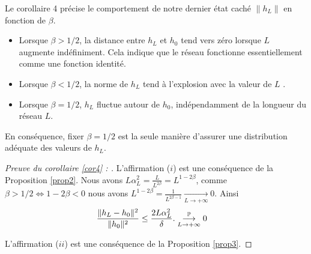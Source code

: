 Le corollaire 4 précise le comportement de notre dernier état caché $\left\| h_L \right\|$ en fonction de $\beta$.
\begin{itemize}
    \item Lorsque $\beta > 1/2$, la distance entre $h_L$ et $h_0$ tend vers zéro lorsque $L$ augmente indéfiniment. Cela indique que le réseau fonctionne essentiellement comme une fonction identité.
    \item Lorsque $\beta < 1/2$, la norme de $h_L$ tend à l'explosion avec la valeur de $ L $ .
    \item Lorsque $\beta = 1/2$, $h_L$ fluctue autour de $h_0$, indépendamment de la longueur du réseau $L$.
\end{itemize}
En conséquence, fixer $\beta = 1/2$ est la seule manière d'assurer une distribution adéquate des valeurs de $h_L$.


\begin{proof}[Preuve du corollaire \ref{cor4} : ]
    L'affirmation ($ i $) est une conséquence de la Proposition \ref{prop2}. Nous avons $ L \alpha _L ^2 = \frac{L}{L^{2\beta} } = L^{1 - 2 \beta } $, comme $ \beta > 1/2 \Leftrightarrow 1 - 2 \beta < 0 $ nous avons $ L^{1 - 2 \beta } = \frac{1}{L^{2 \beta  -1}} \underset{L\to +\infty}{\longrightarrow} 0 $. Ainsi
    \begin{align*}
        & \frac{\|h_L - h_0\|^2}{\|h_0\|^2} \leq \frac{2L\alpha_L^2}{\delta}.
        \overunderset{\mathbb{P}}{L\to +\infty}{\longrightarrow} 0 
    \end{align*}

    L'affirmation ($ ii $) est une conséquence de la Proposition \ref{prop3}.
\end{proof}

